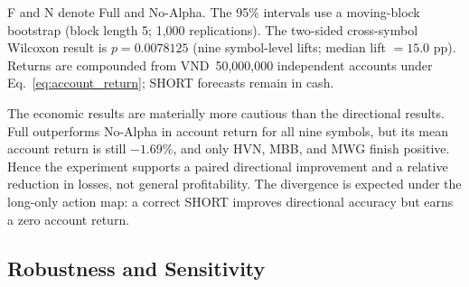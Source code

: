 \begin{table}[!htb]

\vspace{0.4em}
\begin{flushleft}\footnotesize
F and N denote Full and No-Alpha. The 95\% intervals use a moving-block bootstrap (block length 5; 1,000 replications). The two-sided cross-symbol Wilcoxon result is $p=0.0078125$ (nine symbol-level lifts; median lift $=15.0$ pp). Returns are compounded from VND~50,000,000 independent accounts under Eq.~\eqref{eq:account_return}; SHORT forecasts remain in cash.
\end{flushleft}
\end{table}

The economic results are materially more cautious than the directional results. Full outperforms No-Alpha in account return for all nine symbols, but its mean account return is still $-1.69\%$, and only HVN, MBB, and MWG finish positive. Hence the experiment supports a paired directional improvement and a relative reduction in losses, not general profitability. The divergence is expected under the long-only action map: a correct SHORT improves directional accuracy but earns a zero account return.

\subsection{Robustness and Sensitivity}

